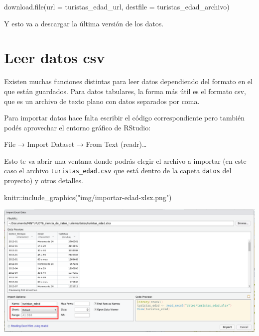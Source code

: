 \documentclass[
  openany]{book}
\newenvironment{Shaded}{\begin{snugshade}}{\end{snugshade}}
\newcommand{\AttributeTok}[1]{\textcolor[rgb]{0.77,0.63,0.00}{#1}}
\newcommand{\FunctionTok}[1]{\textcolor[rgb]{0.00,0.00,0.00}{#1}}
\newcommand{\NormalTok}[1]{#1}
\newcommand{\SpecialCharTok}[1]{\textcolor[rgb]{0.00,0.00,0.00}{#1}}
\newcommand{\StringTok}[1]{\textcolor[rgb]{0.31,0.60,0.02}{#1}}
\begin{document}
\begin{Shaded}
\begin{Highlighting}[]
\FunctionTok{download.file}\NormalTok{(}\AttributeTok{url =}\NormalTok{ turistas\_edad\_url, }\AttributeTok{destfile =}\NormalTok{ turistas\_edad\_archivo)  }
\end{Highlighting}
\end{Shaded}

Y esto va a descargar la última versión de los datos.

\hypertarget{leer-datos-csv}{%
\section{Leer datos csv}\label{leer-datos-csv}}

Existen muchas funciones distintas para leer datos dependiendo del formato en el que están guardados.
Para datos tabulares, la forma más útil es el formato csv, que es un archivo de texto plano con datos separados por coma.

Para importar datos hace falta escribir el código correspondiente pero también podés aprovechar el entorno gráfico de RStudio:

File → Import Dataset → From Text (readr)\ldots{}

Esto te va abrir una ventana donde podrás elegir el archivo a importar (en este caso el archivo \texttt{turistas\_edad.csv} que está dentro de la capeta \texttt{datos} del proyecto) y otros detalles.

\begin{Shaded}
\begin{Highlighting}[]
\NormalTok{knitr}\SpecialCharTok{::}\FunctionTok{include\_graphics}\NormalTok{(}\StringTok{"img/importar{-}edad{-}xlsx.png"}\NormalTok{)}
\end{Highlighting}
\end{Shaded}

\begin{center}\includegraphics[width=1\linewidth]{img/importar-edad-xlsx} \end{center}
\end{document}
